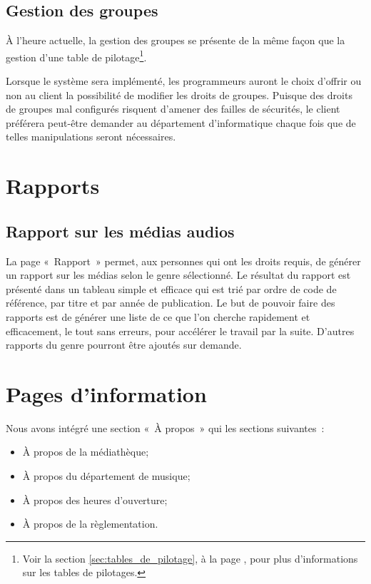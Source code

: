 \documentclass[letter, 11pt]{report}
\begin{document}
\subsection{Gestion des groupes}
À l'heure actuelle, la gestion des groupes se présente de la même façon que la gestion d'une table de pilotage\footnote{Voir la section \ref{sec:tables_de_pilotage}, à la page \pageref{sec:tables_de_pilotage}, pour plus d'informations sur les tables de pilotages.}.

Lorsque le système sera implémenté, les programmeurs auront le choix d'offrir ou non au client la possibilité de modifier les droits de groupes. Puisque des droits de groupes mal configurés risquent d'amener des failles de sécurités, le client préférera peut-être demander au département d'informatique chaque fois que de telles manipulations seront nécessaires.

\section{Rapports}

\subsection{Rapport sur les médias audios}
La page «~Rapport~» permet, aux personnes qui ont les droits requis, de générer un rapport sur les médias selon le genre sélectionné. Le résultat du rapport est présenté dans un tableau simple et efficace qui est trié par ordre de code de référence, par titre et par année de publication. Le but de pouvoir faire des rapports est de générer une liste de ce que l'on cherche rapidement et efficacement, le tout sans erreurs, pour accélérer le travail par la suite. D'autres rapports du genre pourront être ajoutés sur demande.

\section{Pages d'information}

Nous avons intégré une section «~À propos~» qui les sections suivantes~:
\begin{itemize}
	\item À propos de la médiathèque;
	\item À propos du département de musique;
	\item À propos des heures d'ouverture;
	\item À propos de la règlementation.
\end{itemize}
\end{document}
